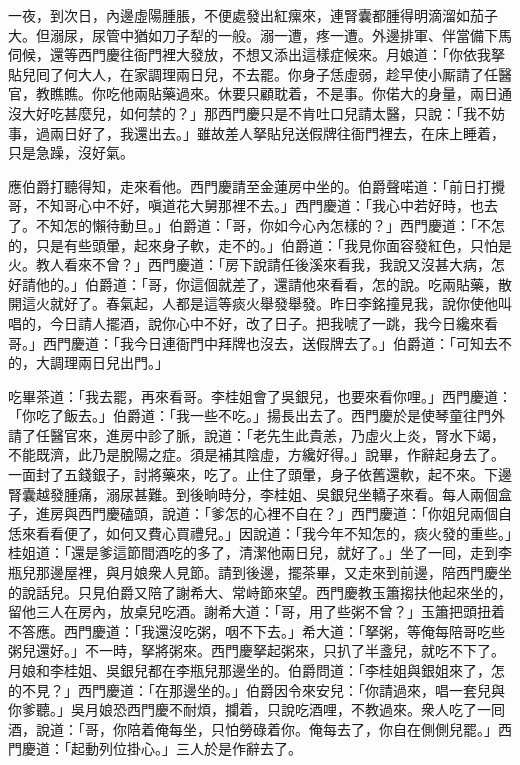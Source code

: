 一夜，到次日，內邊虛陽腫脹，不便處發出紅瘰來，連腎囊都腫得明滴溜如茄子大。但溺尿，尿管中猶如刀子犁的一般。溺一遭，疼一遭。外邊排軍、伴當備下馬伺候，還等西門慶往衙門裡大發放，不想又添出這樣症候來。月娘道：「你依我拏貼兒囘了何大人，在家調理兩日兒，不去罷。你身子恁虛弱，趁早使小厮請了任醫官，教瞧瞧。你吃他兩貼藥過來。休要只顧耽着，不是事。你偌大的身量，兩日通沒大好吃甚麼兒，如何禁的？」那西門慶只是不肯吐口兒請太醫，只說：「我不妨事，過兩日好了，我還出去。」雖故差人拏貼兒送假牌往衙門裡去，在床上睡着，只是急躁，沒好氣。

應伯爵打聽得知，走來看他。西門慶請至金蓮房中坐的。伯爵聲喏道：「前日打攪哥，不知哥心中不好，嗔道花大舅那裡不去。」西門慶道：「我心中若好時，也去了。不知怎的懶待動旦。」伯爵道：「哥，你如今心內怎樣的？」西門慶道：「不怎的，只是有些頭暈，起來身子軟，走不的。」伯爵道：「我見你面容發紅色，只怕是火。教人看來不曾？」西門慶道：「房下說請任後溪來看我，我說又沒甚大病，怎好請他的。」伯爵道：「哥，你這個就差了，還請他來看看，怎的說。吃兩貼藥，散開這火就好了。春氣起，人都是這等痰火舉發舉發。昨日李銘撞見我，說你使他叫唱的，今日請人擺酒，說你心中不好，改了日子。把我唬了一跳，我今日纔來看哥。」西門慶道：「我今日連衙門中拜牌也沒去，送假牌去了。」伯爵道：「可知去不的，大調理兩日兒出門。」

吃畢茶道：「我去罷，再來看哥。李桂姐會了吳銀兒，也要來看你哩。」西門慶道：「你吃了飯去。」伯爵道：「我一些不吃。」揚長出去了。西門慶於是使琴童往門外請了任醫官來，進房中診了脈，說道：「老先生此貴恙，乃虛火上炎，腎水下竭，不能既濟，此乃是脫陽之症。須是補其陰虛，方纔好得。」{}說畢，作辭起身去了。一面封了五錢銀子，討將藥來，吃了。止住了頭暈，{}身子依舊還軟，起不來。下邊腎囊越發腫痛，溺尿甚難。到後晌時分，李桂姐、吳銀兒坐轎子來看。每人兩個盒子，進房與西門慶磕頭，說道：「爹怎的心裡不自在？」西門慶道：「你姐兒兩個自恁來看看便了，如何又費心買禮兒。」因說道：「我今年不知怎的，痰火發的重些。」桂姐道：「還是爹這節間酒吃的多了，清潔他兩日兒，就好了。」坐了一囘，走到李瓶兒那邊屋裡，與月娘衆人見節。請到後邊，擺茶畢，又走來到前邊，陪西門慶坐的說話兒。只見伯爵又陪了謝希大、常峙節來望。西門慶教玉簫搊扶他起來坐的，留他三人在房內，放桌兒吃酒。謝希大道：「哥，用了些粥不曾？」玉簫把頭扭着不答應。西門慶道：「我還沒吃粥，咽不下去。」希大道：「拏粥，等俺每陪哥吃些粥兒還好。」不一時，拏將粥來。西門慶拏起粥來，只扒了半盞兒，就吃不下了。月娘和李桂姐、吳銀兒都在李瓶兒那邊坐的。伯爵問道：「李桂姐與銀姐來了，怎的不見？」西門慶道：「在那邊坐的。」伯爵因令來安兒：「你請過來，唱一套兒與你爹聽。」吳月娘恐西門慶不耐煩，攔着，只說吃酒哩，不教過來。衆人吃了一囘酒，說道：「哥，你陪着俺每坐，只怕勞碌着你。俺每去了，你自在側側兒罷。」西門慶道：「起動列位掛心。」三人於是作辭去了。

